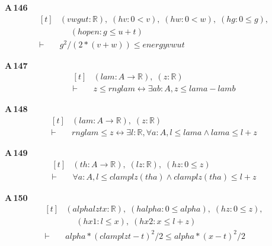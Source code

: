 \noindent\textbf{A\,146}\quad{}
{\footnotesize\[ \begin{aligned}[t]
&(\mathit{v} \mathit{w} \mathit{g} \mathit{u} \mathit{t} : \mathbb{R} ),\; (\mathit{hv} : 0 < \mathit{v}),\; (\mathit{hw} : 0 < \mathit{w}),\; (\mathit{hg} : 0 \leq \mathit{g}),\\
&\quad \; (\mathit{hopen} : \mathit{g} \leq \mathit{u} + \mathit{t})\\
\vdash\;&\mathit{g} ^{2} / (2 * (\mathit{v} + \mathit{w})) \leq \mathit{energy} \mathit{v} \mathit{w} \mathit{u} \mathit{t}
\end{aligned} \]}

\noindent\textbf{A\,147}\quad{}
{\footnotesize\[ \begin{aligned}[t]
&(\mathit{lam} : \mathit{A} \to \mathbb{R} ),\; (\mathit{z} : \mathbb{R} )\\
\vdash\;&\mathit{z} \leq \mathit{rng} \mathit{lam} \leftrightarrow \exists \mathit{a} \mathit{b} : \mathit{A}, \mathit{z} \leq \mathit{lam} \mathit{a} - \mathit{lam} \mathit{b}
\end{aligned} \]}

\noindent\textbf{A\,148}\quad{}
{\footnotesize\[ \begin{aligned}[t]
&(\mathit{lam} : \mathit{A} \to \mathbb{R} ),\; (\mathit{z} : \mathbb{R} )\\
\vdash\;&\mathit{rng} \mathit{lam} \leq \mathit{z} \leftrightarrow \exists \mathit{l} : \mathbb{R} , \forall \mathit{a} : \mathit{A}, \mathit{l} \leq \mathit{lam} \mathit{a} \wedge \mathit{lam} \mathit{a} \leq \mathit{l} + \mathit{z}
\end{aligned} \]}

\noindent\textbf{A\,149}\quad{}
{\footnotesize\[ \begin{aligned}[t]
&(\mathit{th} : \mathit{A} \to \mathbb{R} ),\; (\mathit{l} \mathit{z} : \mathbb{R} ),\; (\mathit{hz} : 0 \leq \mathit{z})\\
\vdash\;&\forall \mathit{a} : \mathit{A}, \mathit{l} \leq \mathit{clamp} \mathit{l} \mathit{z} (\mathit{th} \mathit{a}) \wedge \mathit{clamp} \mathit{l} \mathit{z} (\mathit{th} \mathit{a}) \leq \mathit{l} + \mathit{z}
\end{aligned} \]}

\noindent\textbf{A\,150}\quad{}
{\footnotesize\[ \begin{aligned}[t]
&(\mathit{alpha} \mathit{l} \mathit{z} \mathit{t} \mathit{x} : \mathbb{R} ),\; (\mathit{halpha} : 0 \leq \mathit{alpha}),\; (\mathit{hz} : 0 \leq \mathit{z}),\\
&\quad \; (\mathit{hx1} : \mathit{l} \leq \mathit{x}),\; (\mathit{hx2} : \mathit{x} \leq \mathit{l} + \mathit{z})\\
\vdash\;&\mathit{alpha} * (\mathit{clamp} \mathit{l} \mathit{z} \mathit{t} - \mathit{t}) ^{2} / 2 \leq \mathit{alpha} * (\mathit{x} - \mathit{t}) ^{2} / 2
\end{aligned} \]}

